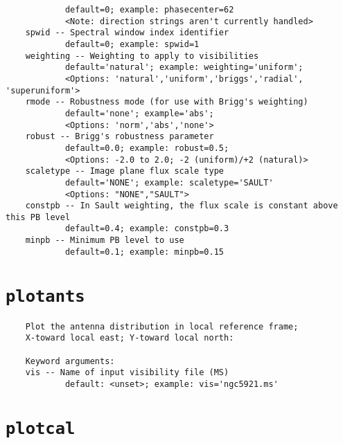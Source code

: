 \begin{verbatim}
            default=0; example: phasecenter=62
            <Note: direction strings aren't currently handled>
    spwid -- Spectral window index identifier
            default=0; example: spwid=1
    weighting -- Weighting to apply to visibilities
            default='natural'; example: weighting='uniform'; 
            <Options: 'natural','uniform','briggs','radial', 'superuniform'>
    rmode -- Robustness mode (for use with Brigg's weighting)
            default='none'; example='abs'; 
            <Options: 'norm','abs','none'>
    robust -- Brigg's robustness parameter 
            default=0.0; example: robust=0.5; 
            <Options: -2.0 to 2.0; -2 (uniform)/+2 (natural)>
    scaletype -- Image plane flux scale type
            default='NONE'; example: scaletype='SAULT'
            <Options: "NONE","SAULT">
    constpb -- In Sault weighting, the flux scale is constant above this PB level
            default=0.4; example: constpb=0.3
    minpb -- Minimum PB level to use
            default=0.1; example: minpb=0.15
\end{verbatim}
\normalsize


\section{{\tt plotants}}
\label{section:tasks.plotants}

\small
\begin{verbatim}
    Plot the antenna distribution in local reference frame; 
    X-toward local east; Y-toward local north:
    
    Keyword arguments:
    vis -- Name of input visibility file (MS)
            default: <unset>; example: vis='ngc5921.ms'

\end{verbatim}
\normalsize


\section{{\tt plotcal}}
\label{section:tasks.plotcal}

